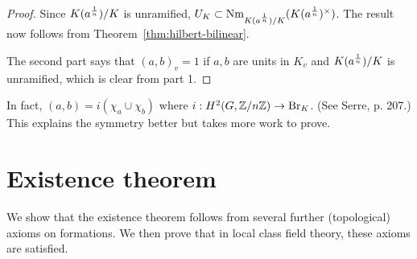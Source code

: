 \begin{proof}
Since $K(a^{\frac{1}{n}})/K$ is unramified, $U_K\subset \operatorname{Nm}_{K(a^{\frac{1}{n}})/K}(K(a^{\frac{1}{n}})^{\times})$. The result now follows from Theorem~\ref{thm:hilbert-bilinear}.

The second part says that $(a,b)_v=1$ if $a,b$ are units in $K_v$ and $K(a^{\frac{1}{n}})/K$ is unramified, which is clear from part 1.
\end{proof}
\begin{rem}
In fact, $(a,b)=i(\chi_a\cup\chi_b)$ where $i:H^2(G,\mathbb{Z}/n\mathbb{Z})\to \operatorname{Br}_K$. (See Serre, p. 207.) This explains the symmetry better but takes more work to prove. 
\end{rem}
\section{Existence theorem}
We show that the existence theorem follows from several further (topological) axioms on formations. We then prove that in local class field theory, these axioms are satisfied. 
